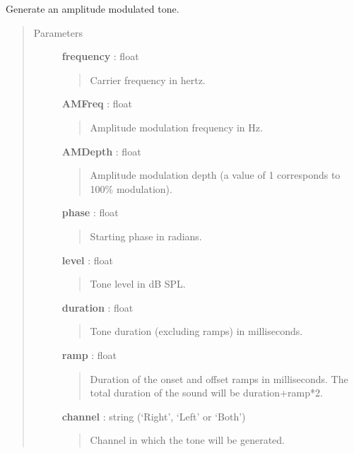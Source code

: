 \documentclass[a4paper,12pt,english]{sphinxmanual}
\begin{document}
\begin{fulllineitems}
\label{sndlib:sndlib.AMTone}
Generate an amplitude modulated tone.
\begin{quote}\begin{description}
\item[{Parameters }] \leavevmode
\textbf{frequency} : float
\begin{quote}

Carrier frequency in hertz.
\end{quote}

\textbf{AMFreq} : float
\begin{quote}

Amplitude modulation frequency in Hz.
\end{quote}

\textbf{AMDepth} : float
\begin{quote}

Amplitude modulation depth (a value of 1
corresponds to 100\% modulation).
\end{quote}

\textbf{phase} : float
\begin{quote}

Starting phase in radians.
\end{quote}

\textbf{level} : float
\begin{quote}

Tone level in dB SPL.
\end{quote}

\textbf{duration} : float
\begin{quote}

Tone duration (excluding ramps) in milliseconds.
\end{quote}

\textbf{ramp} : float
\begin{quote}

Duration of the onset and offset ramps in milliseconds.
The total duration of the sound will be duration+ramp*2.
\end{quote}

\textbf{channel} : string (`Right', `Left' or `Both')
\begin{quote}

Channel in which the tone will be generated.
\end{quote}


\end{description}
\end{quote}
\end{fulllineitems}
\end{document}
